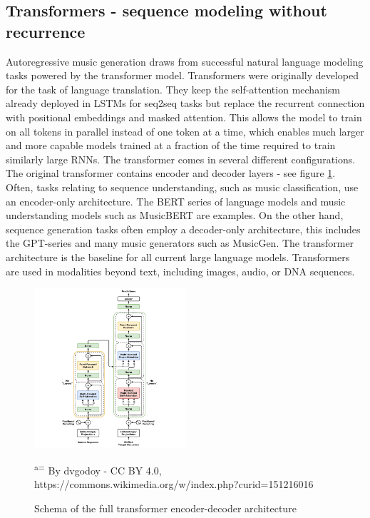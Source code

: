 \subsection{Transformers - sequence modeling without recurrence}
Autoregressive music generation draws from successful natural language modeling tasks powered by the transformer model. Transformers were originally developed for the task of language translation.\cite{Vaswani_Shazeer_Parmar_Uszkoreit_Jones_Gomez_Kaiser_Polosukhin_2017} They keep the self-attention mechanism already deployed in LSTMs for seq2seq tasks \cite{Sutskever_Vinyals_Le_2014} but replace the recurrent connection with positional embeddings and masked attention. This allows the model to train on all tokens in parallel instead of one token at a time, which enables much larger and more capable models trained at a fraction of the time required to train similarly large RNNs. The transformer comes in several different configurations. The original transformer contains encoder and decoder layers - see figure \ref{fig:transformer}. Often, tasks relating to sequence understanding, such as music classification, use an encoder-only architecture. The BERT series of language models \cite{Devlin_Chang_Lee_ToutanovaBERT_2019} and music understanding models such as MusicBERT\cite{Zeng_Tan_Wang_MUSICBERT_2021} are examples. 
On the other hand, sequence generation tasks often employ a decoder-only architecture, this includes the GPT-series \cite{Radford_Wu_Child_Luan_gpt2_2019} and many music generators such as MusicGen\cite{copet2023simple}. The transformer architecture is the baseline for all current large language models. Transformers are used in modalities beyond text, including images, audio, or DNA sequences.

\begin{figure}[H]
    \centering
    \includegraphics[width=0.5\textwidth]{IMAGES/Transformer,_full_architecture.png} 
    \caption{Schema of the full transformer encoder-decoder architecture}
    \small\textsuperscript{a=} By dvgodoy - CC BY 4.0, https://commons.wikimedia.org/w/index.php?curid=151216016
    \label{fig:transformer}
    
\end{figure}

